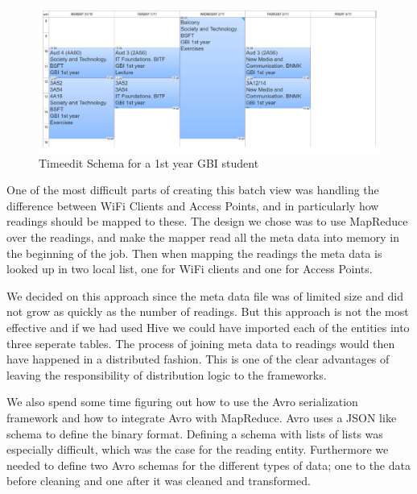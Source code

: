	\begin{figure}[H]
		\centering
		\includegraphics[width=\linewidth]{figures/schema-from-timeedit.png}
		\caption{Timeedit Schema for a 1st year GBI student}
		\label{fig:timeedit_schema}
	\end{figure}
	
	\newpar One of the most difficult parts of creating this batch view was handling the difference between WiFi Clients and Access Points, and in particularly how readings should be mapped to these. The design we chose was to use MapReduce over the readings, and make the mapper read all the meta data into memory in the beginning of the job. Then when mapping the readings the meta data is looked up in two local list, one for WiFi clients and one for Access Points. 
	
	We decided on this approach since the meta data file was of limited size and did not grow as quickly as the number of readings. But this approach is not the most effective and if we had used Hive we could have imported each of the entities into three seperate tables. The process of joining meta data to readings would then have happened in a distributed fashion. This is one of the clear advantages of leaving the responsibility of distribution logic to the frameworks.
	
	\newpar We also spend some time figuring out how to use the Avro serialization framework and how to integrate Avro with MapReduce. Avro uses a JSON like schema to define the binary format. Defining a schema with lists of lists was especially difficult, which was the case for the reading entity. Furthermore we needed to define two Avro schemas for the different types of data; one to the data before cleaning and one after it was cleaned and transformed.